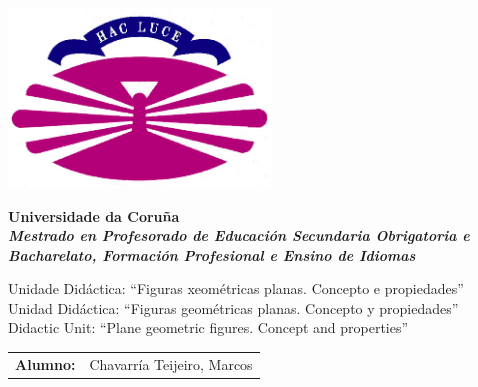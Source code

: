 %
%

%

\begin{titlepage}

  \begin{center}

    \includegraphics[width=7cm]{./eps/logo_udc.jpg}
    \vspace{0.35cm}

    {\Large{\textbf{Universidade da Coruña}}} \\
    {\it \large{\textbf{Mestrado en Profesorado de Educación Secundaria Obrigatoria e Bacharelato, Formación Profesional e Ensino de Idiomas}}}
    \vspace{2cm}

    {\Huge Unidade Didáctica: ``Figuras xeométricas planas. Concepto e propiedades''} \\\vspace{0.4cm}
    {\large Unidad Didáctica: ``Figuras geométricas planas. Concepto y propiedades''} \\ \vspace{0.15cm}
    {\large Didactic Unit: ``Plane geometric figures. Concept and properties''}

  \end{center}

  \begin{bottompar}
    \begin{flushright}
      \begin{tabular}{rl}
        \large{\textbf{Alumno:}}
        & \large{Chavarría Teijeiro, Marcos} \\


\end{tabular}
\end{flushright}
\end{bottompar}
\end{titlepage}
